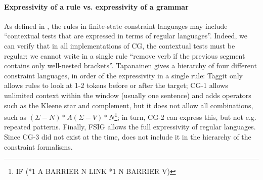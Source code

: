 


\paragraph{Expressivity of a rule vs. expressivity of a grammar}

As defined in \cite{tapanainen1999phd}, the rules in finite-state constraint languages may include ``contextual tests that are expressed in terms of regular languages''. 
Indeed, we can verify that in all implementations of CG, 
the contextual tests must be regular: we cannot write in a single rule ``remove verb if the previous segment contains only well-nested brackets''.
Tapanainen gives a hierarchy of four different constraint languages, in order of the expressivity in a single rule: Taggit \cite{taggit} only allows rules to look at 1-2 tokens before or after the target; CG-1 \cite{karlsson1990cgp} allows unlimited context within the window (usually one sentence) and adds operators such as the Kleene star and complement, but it does not allow all combinations, such as $(\Sigma - N)*A(\Sigma - V)*N$\footnote{IF (*1 A BARRIER N LINK *1 N BARRIER V)}; in turn, CG-2 \cite{tapanainen1996} can express this, but not e.g. repeated patterns. Finally, FSIG \cite{koskenniemi90} allows the full expressivity of regular languages. Since CG-3 \cite{bick2015} did not exist at the time, \cite{tapanainen1999phd} does not include it in the hierarchy of the constraint formalisms.

